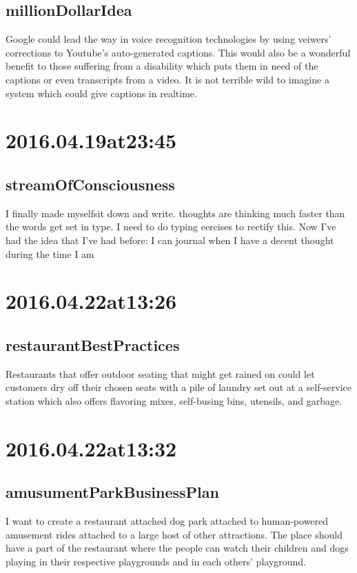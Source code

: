 \subsection*{millionDollarIdea}
Google could lead the way in voice recognition technologies by using veiwers' corrections to Youtube's auto-generated captions. This would also be a wonderful benefit to those suffering from a disability which puts them in need of the captions or even transcripts from a video. It is not terrible wild to imagine a system which could give captions in realtime.

\section*{ 2016.04.19at23:45 }
\subsection*{streamOfConsciousness}
I finally made myselfsit down and write. thoughts are thinking much faster than the words get set in type. I need to do typing eercises to rectify this. Now I've had the idea that I've had before: I can journal when I have a decent thought during the time I am 

\section*{ 2016.04.22at13:26 }
\subsection*{restaurantBestPractices}
Restaurants that offer outdoor seating that might get rained on could let customers dry off their chosen seats with a pile of laundry set out at a self-service station which also offers flavoring mixes, self-busing bins, utensils, and garbage.

\section*{ 2016.04.22at13:32 }
\subsection*{amusumentParkBusinessPlan}
I want to create a restaurant attached dog park attached to human-powered amusement rides attached to a large host of other attractions. The place should have a part of the restaurant where the people can watch their children and dogs playing in their respective playgrounds and in each others' playground. 

